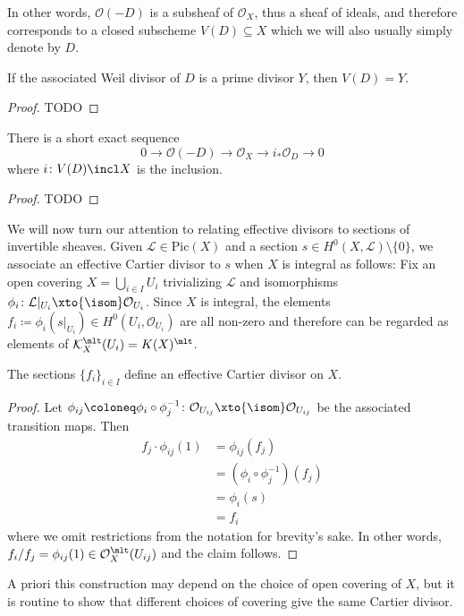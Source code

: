 \documentclass[wip, algebra]{bsteffan-lecturenotes}
\newcommand{\cO}{\mathcal{O}}
\newcommand{\cK}{\mathcal{K}}
\newcommand{\cL}{\mathcal{L}}
\newcommand{\Pic}{\mathrm{Pic}}
\begin{document}
In other words, $\cO(-D)$ is a subsheaf of $\cO_X$, thus a sheaf of ideals, and therefore corresponds to a closed subscheme $V(D) \subseteq X$ which we will also usually simply denote by $D$.
\begin{proposition}
	If the associated Weil divisor of $D$ is a prime divisor $Y$, then $V(D) = Y$.
\end{proposition}
\begin{proof}
	TODO
\end{proof}
\begin{proposition}
	There is a short exact sequence
	\begin{equation*}
		0 \to \cO(-D) \to \cO_X \to i_* \cO_D \to 0
	\end{equation*}
	where $i\colon V(D) \incl X$ is the inclusion.
\end{proposition}
\begin{proof}
	TODO
\end{proof}
We will now turn our attention to relating effective divisors to sections of invertible sheaves.
Given $\cL \in \Pic(X)$ and a section $s \in H^0(X, \cL) \setminus \{0\}$, we associate an effective Cartier divisor to $s$ when $X$ is integral as follows:
Fix an open covering $X = \bigcup_{i \in I} U_i$ trivializing $\cL$ and isomorphisms $\phi_i\colon \cL|_{U_i} \xto{\isom} \cO_{U_i}$. 
Since $X$ is integral, the elements $f_i \coloneq \phi_i(s|_{U_i}) \in H^0(U_i, \cO_{U_i})$ are all non-zero and therefore can be regarded as elements of $\cK_X^\mlt(U_i) = K(X)^\mlt$.
\begin{proposition}
	The sections $\{f_i\}_{i \in I}$ define an effective Cartier divisor on $X$.
\end{proposition}
\begin{proof}
	Let $\phi_{ij} \coloneq \phi_i \circ \phi_j^{-1}\colon \cO_{U_{ij}} \xto{\isom} \cO_{U_{ij}}$ be the associated transition maps.
	Then
	\begin{align*} 
		f_j \cdot \phi_{ij}(1) &= \phi_{ij}(f_j) \\
							   &= (\phi_i \circ \phi_j^{-1})(f_j) \\
							   &= \phi_i(s) \\
							   &= f_i
	\end{align*}
	where we omit restrictions from the notation for brevity's sake.
	In other words, $f_i / f_j = \phi_{ij}(1) \in \cO_X^\mlt(U_{ij})$ and the claim follows.
\end{proof}
A priori this construction may depend on the choice of open covering of $X$, but it is routine to show that different choices of covering give the same Cartier divisor.
\end{document}
